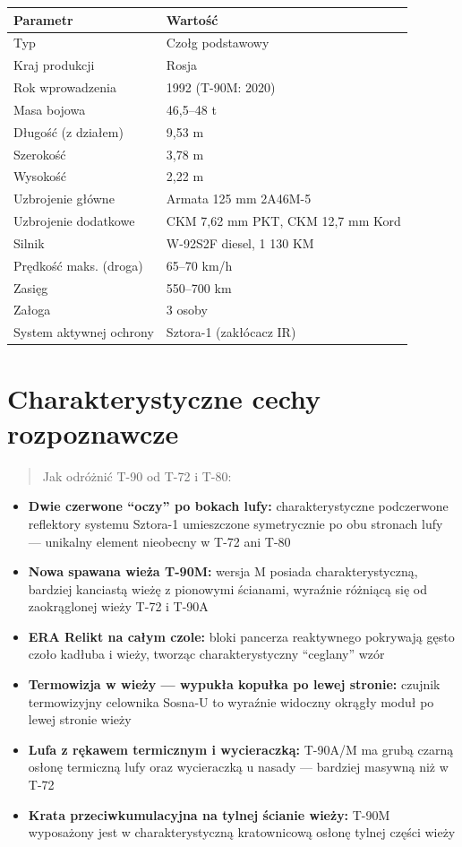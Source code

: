 \documentclass[12pt,openany,oneside]{book}
\providecommand{\tightlist}{%
  \setlength{\itemsep}{0pt}\setlength{\parskip}{0pt}}
\begin{document}
\begin{longtable}[]{@{}ll@{}}
\toprule\noalign{}
Parametr & Wartość \\
\midrule\noalign{}
\endhead
\bottomrule\noalign{}
\endlastfoot
Typ & Czołg podstawowy \\
Kraj produkcji & Rosja \\
Rok wprowadzenia & 1992 (T-90M: 2020) \\
Masa bojowa & 46,5--48 t \\
Długość (z działem) & 9,53 m \\
Szerokość & 3,78 m \\
Wysokość & 2,22 m \\
Uzbrojenie główne & Armata 125 mm 2A46M-5 \\
Uzbrojenie dodatkowe & CKM 7,62 mm PKT, CKM 12,7 mm Kord \\
Silnik & W-92S2F diesel, 1 130 KM \\
Prędkość maks. (droga) & 65--70 km/h \\
Zasięg & 550--700 km \\
Załoga & 3 osoby \\
System aktywnej ochrony & Sztora-1 (zakłócacz IR) \\
\end{longtable}

\section{Charakterystyczne cechy
rozpoznawcze}\label{charakterystyczne-cechy-rozpoznawcze-2}

\begin{quote}
Jak odróżnić T-90 od T-72 i T-80:
\end{quote}

\begin{itemize}
\tightlist
\item
  \textbf{Dwie czerwone ``oczy'' po bokach lufy:} charakterystyczne
  podczerwone reflektory systemu Sztora-1 umieszczone symetrycznie po
  obu stronach lufy --- unikalny element nieobecny w T-72 ani T-80
\item
  \textbf{Nowa spawana wieża T-90M:} wersja M posiada charakterystyczną,
  bardziej kanciastą wieżę z pionowymi ścianami, wyraźnie różniącą się
  od zaokrąglonej wieży T-72 i T-90A
\item
  \textbf{ERA Relikt na całym czole:} bloki pancerza reaktywnego
  pokrywają gęsto czoło kadłuba i wieży, tworząc charakterystyczny
  ``ceglany'' wzór
\item
  \textbf{Termowizja w wieży --- wypukła kopułka po lewej stronie:}
  czujnik termowizyjny celownika Sosna-U to wyraźnie widoczny okrągły
  moduł po lewej stronie wieży
\item
  \textbf{Lufa z rękawem termicznym i wycieraczką:} T-90A/M ma grubą
  czarną osłonę termiczną lufy oraz wycieraczką u nasady --- bardziej
  masywną niż w T-72
\item
  \textbf{Krata przeciwkumulacyjna na tylnej ścianie wieży:} T-90M
  wyposażony jest w charakterystyczną kratownicową osłonę tylnej części
  wieży
\end{itemize}
\end{document}
